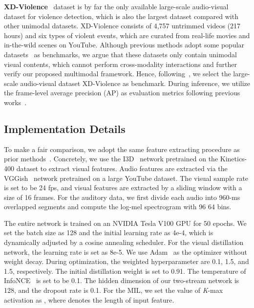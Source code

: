 \documentclass[sigconf]{acmart}
\begin{document}
\textbf{XD-Violence}~\cite{wu2020not} dataset is by far the only available large-scale audio-visual dataset for violence detection, which is also the largest dataset compared with other unimodal datasets. XD-Violence consists of 4,757 untrimmed videos (217 hours) and six types of violent events, which are curated from real-life movies and in-the-wild scenes on YouTube. Although previous methods adopt some popular datasets~\cite{sultani2018real, liu2018future} as benchmarks, we argue that these datasets only contain unimodal visual contents, which cannot perform cross-modality interactions and further verify our proposed multimodal framework. Hence, following~\cite{wu2020not, pang2021violence}, we select the large-scale audio-visual dataset XD-Violence as benchmark. During inference, we utilize the frame-level average precision (AP) as evaluation metrics following previous works~\cite{wu2020not, pang2021violence, tian2021weakly}.

\subsection{Implementation Details}

To make a fair comparison, we adopt the same feature extracting procedure as prior methods~\cite{wu2020not, pang2021violence, wu2021learning, tian2021weakly}. Concretely, we use the I3D~\cite{carreira2017quo} network pretrained on the Kinetics-400 dataset to extract visual features. Audio features are extracted via the VGGish~\cite{gemmeke2017audio, hershey2017cnn} network pretrained on a large YouTube dataset. The visual sample rate is set to be 24 fps, and visual features are extracted by a sliding window with a size of 16 frames. For the auditory data, we first divide each audio into 960-ms overlapped segments and compute the log-mel spectrogram with 96  64 bins. 

The entire network is trained on an NVIDIA Tesla V100 GPU for 50 epochs. We set the batch size as 128 and the initial learning rate as 4e-4, which is dynamically adjusted by a cosine annealing scheduler. For the visual distillation network, the learning rate is set as 8e-5. We use Adam~\cite{kingma2014adam} as the optimizer without weight decay. During optimization, the weighted hyperparameter  are 0.1, 1.5, and 1.5, respectively. The initial distillation weight  is set to 0.91. The temperature  of InfoNCE~\cite{van2018representation} is set to be 0.1. The hidden dimension of our two-stream network is 128, and the dropout rate is 0.1. For the MIL, we set the value  of \textit{K}-max activation as , where  denotes the length of input feature.
\end{document}
